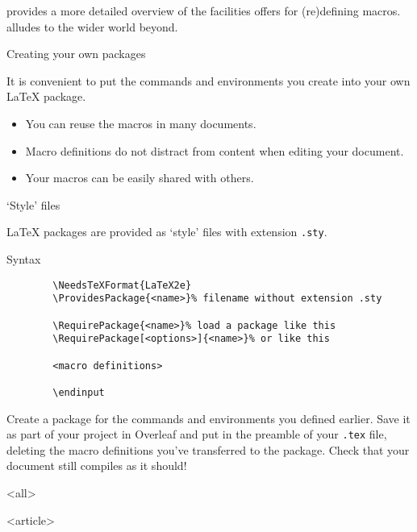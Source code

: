  provides a more detailed overview of the facilities \LaTeXe{} offers for (re)defining macros.
 alludes to the wider world beyond.


\begin{frame}{Creating your own packages}

  It is convenient to put the commands and environments you create into your own \LaTeX{} package.
  \begin{itemize}
  	\item You can reuse the macros in many documents.
	\item Macro definitions do not distract from content when editing your document.
	\item Your macros can be easily shared with others.
  \end{itemize}

\end{frame}

\begin{frame}[fragile]{‘Style’ files}

  \LaTeX{} packages are provided as ‘style’ files with extension \texttt{.sty}.
  \begin{block}{Syntax}
	\begin{verbatim}
		\NeedsTeXFormat{LaTeX2e}
		\ProvidesPackage{<name>}% filename without extension .sty

		\RequirePackage{<name>}% load a package like this
		\RequirePackage[<options>]{<name>}% or like this

		<macro definitions>

		\endinput
	\end{verbatim}
  \end{block}

\end{frame}

\begin{exercise}
	Create a package for the commands and environments you defined earlier.
	Save it as part of your project in Overleaf and put  in the preamble of your \texttt{.tex} file, deleting the macro definitions you've transferred to the package.
	Check that your document still compiles as it should!
\end{exercise}


\mode
<all>

\mode
<article>

